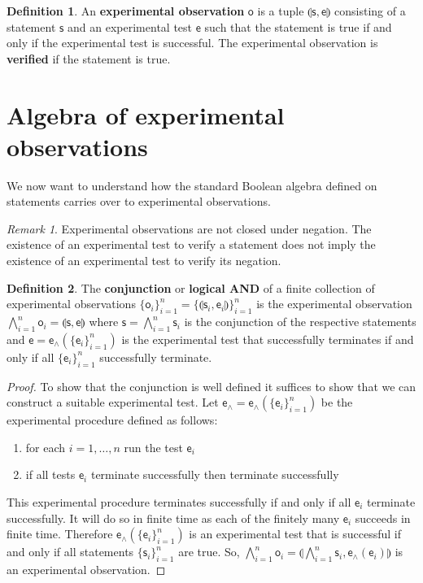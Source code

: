 \documentclass[preprint]{elsarticle}
\theoremstyle{plain}%
\theoremstyle{definition}
\newtheorem{defn}{Definition}[section]
\theoremstyle{remark}
\newtheorem*{rem}{Remark}
\begin{document}
\begin{defn}
	An \textbf{experimental observation} $\mathsf{o}$ is a tuple $\llparenthesis \mathsf{s}, \mathsf{e} \rrparenthesis$ consisting of a statement $\mathsf{s}$ and an experimental test $\mathsf{e}$ such that the statement is true if and only if the  experimental test is successful. The experimental observation is \textbf{verified} if the statement is true.
\end{defn}

\section{Algebra of experimental observations}

We now want to understand how the standard Boolean algebra defined on statements carries over to experimental observations.

\begin{rem}
	Experimental observations are not closed under negation. The existence of an experimental test to verify a statement does not imply the existence of an experimental test to verify its negation.
\end{rem}

\begin{defn}
	The \textbf{conjunction} or \textbf{logical AND} of a finite collection  of experimental observations $\{\mathsf{o}_i\}_{i=1}^{n}=\{\llparenthesis \mathsf{s}_i, \mathsf{e}_i\rrparenthesis\}_{i=1}^{n}$ is the experimental observation $\bigwedge\limits_{i=1}^{n} \mathsf{o}_i = \llparenthesis \mathsf{s}, \mathsf{e}\rrparenthesis$ where $\mathsf{s} = \bigwedge\limits_{i=1}^{n} \mathsf{s}_i$ is the conjunction of the respective statements and $\mathsf{e} = \mathsf{e}_\wedge(\{\mathsf{e}_i\}_{i=1}^{n})$ is the experimental test that successfully terminates if and only if all $\{\mathsf{e}_i\}_{i=1}^{n}$ successfully terminate.
\end{defn}

\begin{proof}
	To show that the conjunction is well defined it suffices to show that we can construct a suitable experimental test.  Let $\mathsf{e}_\wedge=\mathsf{e}_\wedge(\{\mathsf{e}_i\}_{i=1}^{n})$ be the experimental procedure defined as follows:
	\begin{enumerate}
	\item for each $i=1,\ldots,n$ run the test $\mathsf{e}_i$
	\item if all tests $\mathsf{e}_i$ terminate successfully then terminate successfully
	\end{enumerate}
	This experimental procedure terminates successfully if and only if all $\mathsf{e}_i$ terminate successfully. It will do so in finite time as each of the finitely many $\mathsf{e}_i$ succeeds in finite time. Therefore $\mathsf{e}_\wedge(\{\mathsf{e}_i\}_{i=1}^{n})$ is an experimental test that is successful if and only if all statements $\{\mathsf{s}_i\}_{i=1}^{n}$ are true. So, $\bigwedge\limits_{i=1}^{n} \mathsf{o}_i = \llparenthesis\bigwedge\limits_{i=1}^{n} \mathsf{s}_i, \mathsf{e}_{\wedge}(\mathsf{e}_i)\rrparenthesis$ is an experimental observation.
\end{proof}
\end{document}
